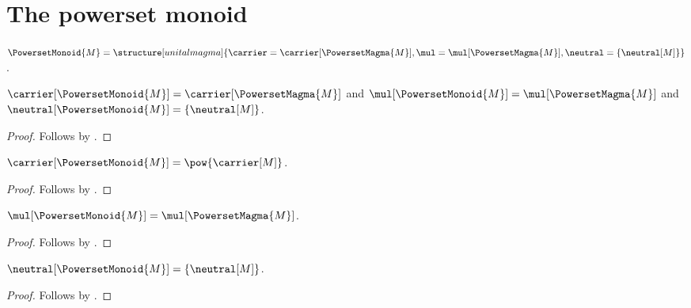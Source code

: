 


\section{The powerset monoid}

\begin{definition}\label{powerset_monoid}
    $\PowersetMonoid{M}=\structure[unital magma]{
        \carrier=\carrier[\PowersetMagma{M}],
        \mul=\mul[\PowersetMagma{M}],
        \neutral=\{\neutral[M]\}
    }$.
\end{definition}

\begin{proposition}\label{powerset_monoid_fields}
    $\carrier[\PowersetMonoid{M}]
        =\carrier[\PowersetMagma{M}]$ and
    $\mul[\PowersetMonoid{M}]=\mul[\PowersetMagma{M}]$ and
    $\neutral[\PowersetMonoid{M}]=\{\neutral[M]\}$.
\end{proposition}
\begin{proof}
    Follows by
        .
\end{proof}

\begin{proposition}\label{powerset_monoid_carrier}
    $\carrier[\PowersetMonoid{M}]=\pow{\carrier[M]}$.
\end{proposition}
\begin{proof}
    Follows by
        .
\end{proof}

\begin{proposition}\label{powerset_monoid_multiplication}
    $\mul[\PowersetMonoid{M}]=\mul[\PowersetMagma{M}]$.
\end{proposition}
\begin{proof}
    Follows by .
\end{proof}

\begin{proposition}\label{powerset_monoid_neutral}
    $\neutral[\PowersetMonoid{M}]=\{\neutral[M]\}$.
\end{proposition}
\begin{proof}
    Follows by .
\end{proof}


